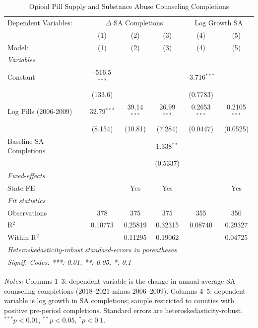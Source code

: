 
\begin{table}[htbp]
   \caption{\label{tab:main} Opioid Pill Supply and Substance Abuse Counseling Completions}
   \centering
   \begin{tabular}{lccccc}
      \tabularnewline \midrule \midrule
      Dependent Variables: & \multicolumn{3}{c}{$\Delta$ SA Completions} & \multicolumn{2}{c}{Log Growth SA}\\
                              & (1)            & (2)           & (3)           & (4)            & (5) \\   
      Model:                  & (1)            & (2)           & (3)           & (4)            & (5)\\  
      \midrule
      \emph{Variables}\\
      Constant                & -516.5$^{***}$ &               &               & -3.716$^{***}$ &   \\   
                              & (133.6)        &               &               & (0.7783)       &   \\   
      Log Pills (2006-2009)   & 32.79$^{***}$  & 39.14$^{***}$ & 26.99$^{***}$ & 0.2653$^{***}$ & 0.2105$^{***}$\\   
                              & (8.154)        & (10.81)       & (7.284)       & (0.0447)       & (0.0525)\\   
      Baseline SA Completions &                &               & 1.338$^{**}$  &                &   \\   
                              &                &               & (0.5337)      &                &   \\   
      \midrule
      \emph{Fixed-effects}\\
      State FE                &                & Yes           & Yes           &                & Yes\\  
      \midrule
      \emph{Fit statistics}\\
      Observations            & 378            & 375           & 375           & 355            & 350\\  
      R$^2$                   & 0.10773        & 0.25819       & 0.32315       & 0.08740        & 0.29327\\  
      Within R$^2$            &                & 0.11295       & 0.19062       &                & 0.04725\\  
      \midrule \midrule
      \multicolumn{6}{l}{\emph{Heteroskedasticity-robust standard-errors in parentheses}}\\
      \multicolumn{6}{l}{\emph{Signif. Codes: ***: 0.01, **: 0.05, *: 0.1}}\\
   \end{tabular}
   
   \par \raggedright 
   \textit{Notes:} Columns 1--3: dependent variable is the change in annual average SA counseling completions (2018--2021 minus 2006--2009). Columns 4--5: dependent variable is log growth in SA completions; sample restricted to counties with positive pre-period completions. Standard errors are heteroskedasticity-robust. $^{***}p<0.01$, $^{**}p<0.05$, $^{*}p<0.1$.
\end{table}


